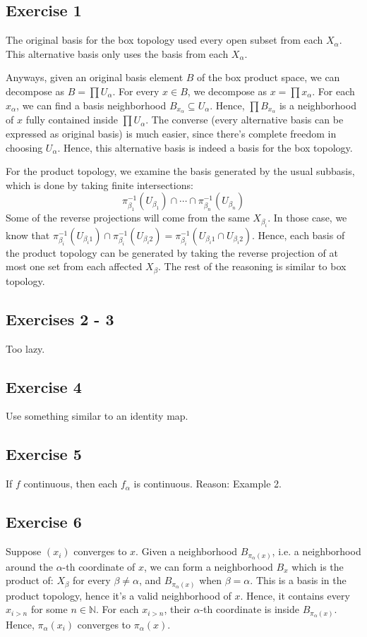 \documentclass{book}
\begin{document}
\subsection*{Exercise 1}
The original basis for the box topology used every open subset from each $X_\alpha$. This alternative basis only uses the basis from each $X_\alpha$.

Anyways, given an original basis element $B$ of the box product space, we can decompose as $B = \prod U_\alpha$. For every $x \in B$, we decompose as $x = \prod x_\alpha$. For each $x_\alpha$, we can find a basis neighborhood $B_{x_\alpha} \subseteq U_\alpha$. Hence, $\prod B_{x_\alpha}$ is a neighborhood of $x$ fully contained inside $\prod U_\alpha$. The converse (every alternative basis can be expressed as original basis) is much easier, since there's complete freedom in choosing $U_\alpha$. Hence, this alternative basis is indeed a basis for the box topology.

For the product topology, we examine the basis generated by the usual subbasis, which is done by taking finite intersections:
$$\pi^{-1}_{\beta_1} (U_{\beta_1}) \cap \cdots \cap \pi^{-1}_{\beta_n} (U_{\beta_n})$$
Some of the reverse projections will come from the same $X_{\beta_i}$. In those case, we know that $\pi^{-1}_{\beta_i}(U_{\beta_i 1}) \cap \pi^{-1}_{\beta_i}(U_{\beta_i 2}) = \pi^{-1}_{\beta_i}(U_{\beta_i 1} \cap U_{\beta_i 2})$. Hence, each basis of the product topology can be generated by taking the reverse projection of at most one set from each affected $X_\beta$. The rest of the reasoning is similar to box topology.

\subsection*{Exercises 2 - 3}
Too lazy.

\subsection*{Exercise 4}
Use something similar to an identity map.

\subsection*{Exercise 5}
If $f$ continuous, then each $f_\alpha$ is continuous. Reason: Example 2.

\subsection*{Exercise 6}
Suppose $(x_i)$ converges to $x$. Given a neighborhood $B_{\pi_\alpha(x)}$, i.e. a neighborhood around the $\alpha$-th coordinate of $x$, we can form a neighborhood $B_x$ which is the product of: $X_\beta$ for every $\beta \neq \alpha$, and $B_{\pi_\alpha (x)}$ when $\beta = \alpha$. This is a basis in the product topology, hence it's a valid neighborhood of $x$. Hence, it contains every $x_{i > n}$ for some $n \in \mathbb{N}$. For each $x_{i > n}$, their $\alpha$-th coordinate is inside $B_{\pi_\alpha (x)}$. Hence, $\pi_\alpha(x_i)$ converges to $\pi_\alpha(x)$.
\end{document}
